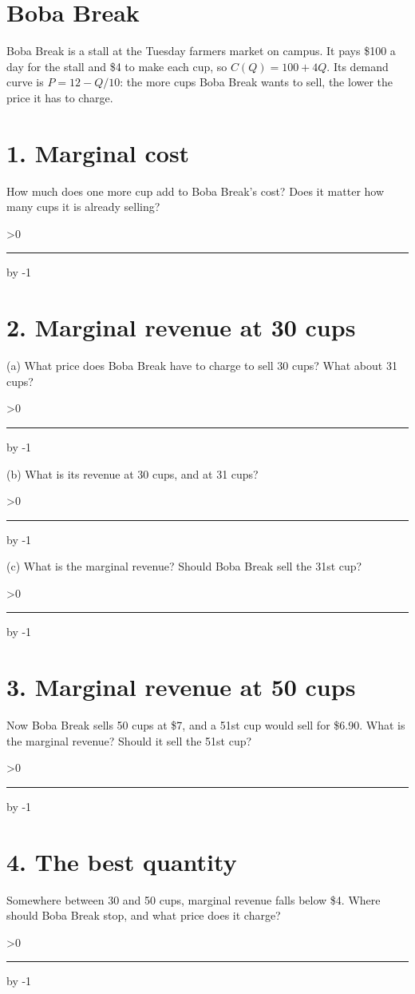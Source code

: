 \documentclass[11pt]{article}
\newcommand{\answerlines}[1]{%
  \par\vspace{1pt}\answerlinecount=#1
  \loop\ifnum\answerlinecount>0
    \rule{\linewidth}{0.3pt}\par\vspace{5pt}%
    \advance\answerlinecount by -1
  \repeat
  \vspace{-5pt}}
\begin{document}
\section{Boba Break}

Boba Break is a stall at the Tuesday farmers market on campus. It pays \$100 a
day for the stall and \$4 to make each cup, so $C(Q) = 100 + 4Q$. Its demand
curve is $P = 12 - Q/10$: the more cups Boba Break wants to sell, the lower the
price it has to charge.

\section{1. Marginal cost}

How much does one more cup add to Boba Break's cost? Does it matter how many
cups it is already selling?
\answerlines{2}

\section{2. Marginal revenue at 30 cups}

(a) What price does Boba Break have to charge to sell 30 cups? What about 31
cups?
\answerlines{1}

(b) What is its revenue at 30 cups, and at 31 cups?
\answerlines{1}

(c) What is the marginal revenue? Should Boba Break sell the 31st cup?
\answerlines{1}

\section{3. Marginal revenue at 50 cups}

Now Boba Break sells 50 cups at \$7, and a 51st cup would sell for \$6.90. What
is the marginal revenue? Should it sell the 51st cup?
\answerlines{2}

\section{4. The best quantity}

Somewhere between 30 and 50 cups, marginal revenue falls below \$4. Where
should Boba Break stop, and what price does it charge?
\answerlines{2}
\end{document}
